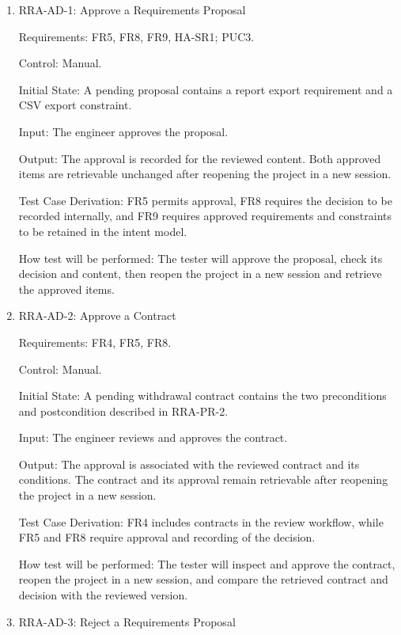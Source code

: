 \documentclass[12pt, titlepage]{article}
\begin{document}
\begin{enumerate}

\item{RRA-AD-1: Approve a Requirements Proposal\\}

Requirements: FR5, FR8, FR9, HA-SR1; PUC3.

Control: Manual.

Initial State: A pending proposal contains a report export requirement and a
CSV export constraint.

Input: The engineer approves the proposal.

Output: The approval is recorded for the reviewed content. Both approved items
are retrievable unchanged after reopening the project in a new session.

Test Case Derivation: FR5 permits approval, FR8 requires the decision to be
recorded internally, and FR9 requires approved requirements and constraints to
be retained in the intent model.

How test will be performed: The tester will approve the proposal, check its
decision and content, then reopen the project in a new session and retrieve
the approved items.

\item{RRA-AD-2: Approve a Contract\\}

Requirements: FR4, FR5, FR8.

Control: Manual.

Initial State: A pending withdrawal contract contains the two preconditions
and postcondition described in RRA-PR-2.

Input: The engineer reviews and approves the contract.

Output: The approval is associated with the reviewed contract and its
conditions. The contract and its approval remain retrievable after reopening
the project in a new session.

Test Case Derivation: FR4 includes contracts in the review workflow, while FR5
and FR8 require approval and recording of the decision.

How test will be performed: The tester will inspect and approve the contract,
reopen the project in a new session, and compare the retrieved contract and
decision with the reviewed version.

\item{RRA-AD-3: Reject a Requirements Proposal\\}


\end{enumerate}
\end{document}
